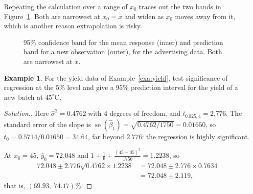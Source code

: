 \documentclass[11pt,a4paper]{article}
\numberwithin{equation}{section}
\theoremstyle{definition}
\newtheorem{exa}[thm]{Example}
\newenvironment{solution}
  {\renewcommand{\qedsymbol}{}\begin{proof}[\textit{Solution}.]}
  {\end{proof}}
\begin{document}
Repeating the calculation over a range of $x_0$ traces out the two bands in
Figure~\ref{fig:bands}. Both are narrowest at $x_0 = \bar x$ and widen as $x_0$ moves away
from it, which is another reason extrapolation is risky.

\begin{figure}[H]
\centering
{}
\caption{95\% confidence band for the mean response (inner) and prediction band for a new
observation (outer), for the advertising data. Both are narrowest at $\bar x$.}
\label{fig:bands}
\end{figure}

\begin{exa}
For the yield data of Example~\ref{exa:yield}, test significance of regression at the 5\%
level and give a 95\% prediction interval for the yield of a new batch at $45^\circ$C.
\end{exa}

\begin{solution}
Here $\hat\sigma^2 = 0.4762$ with $4$ degrees of freedom, and $t_{0.025,4} = 2.776$.
The standard error of the slope is
$\operatorname{se}(\hat\beta_1) = \sqrt{0.4762/1750} = 0.01650$, so
$t_0 = 0.5714/0.01650 = 34.64$, far beyond $2.776$: the regression is highly significant.

At $x_0 = 45$, $\hat y_0 = 72.048$ and
$1 + \frac16 + \frac{(45 - 35)^2}{1750} = 1.2238$, so
\begin{align*}
72.048 \pm 2.776 \sqrt{0.4762 \times 1.2238} &= 72.048 \pm 2.776 \times 0.7634 \\
&= 72.048 \pm 2.119 ,
\end{align*}
that is, $(69.93,\ 74.17)\%$.
\end{solution}
\end{document}
